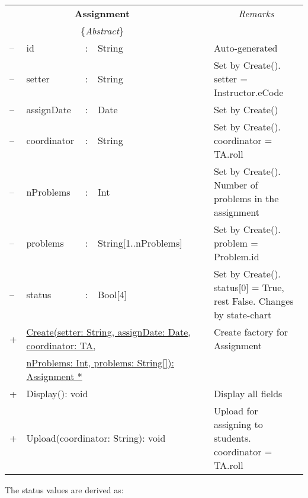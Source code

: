 \documentclass{article}
\begin{document}
\begin{enumerate}
\begin{center}
\begin{scriptsize}
\begin{tabular}{|lllll|l|p{7cm}|} \cline{1-5} \cline{7-7}
\multicolumn{5}{|c|}{\bf \textsf{Assignment}} 			& & \multicolumn{1}{|c|}{\em Remarks}\\
\multicolumn{5}{|c|}{\{{\em Abstract}\} } 	& & \multicolumn{1}{|c|}{\em }\\ \cline{1-5} \cline{7-7}
-- & \textsf{id} 			& : & String 				& & & Auto-generated\\
-- & \textsf{setter} 		& : & String 				& & & Set by Create(). \textsf{setter} = \textsf{Instructor.eCode} \\
-- & \textsf{assignDate} 	& : & Date 					& & & Set by Create() \\
-- & \textsf{coordinator}	& : & String 				& & & Set by Create(). \textsf{coordinator} = \textsf{TA.roll} \\
-- & \textsf{nProblems}		& : & Int 					& & & Set by Create(). Number of problems in the assignment \\
-- & \textsf{problems} 		& : & String[1..\textsf{nProblems}]			& & & Set by Create(). \textsf{problem} = \textsf{Problem.id} \\
-- & \textsf{status} 		& : & Bool[4] 				& & & Set by Create(). \textsf{status[0]} = True, rest False. Changes by state-chart  \\ \cline{1-5} \cline{7-7}
 + & \multicolumn{4}{l|}{\underline{Create(setter: String, assignDate: Date, coordinator: TA,}} & & Create factory for Assignment \\ 
   & \multicolumn{4}{l|}{\quad \quad \underline{nProblems: Int, problems: String[]): Assignment *}} & &  \\
 + & \multicolumn{4}{l|}{Display(): void}  & & Display all fields \\ 
 + & \multicolumn{4}{l|}{Upload(coordinator: String): void} & & Upload for assigning to students. \textsf{coordinator} = \textsf{TA.roll} \\ 
 \cline{1-5} \cline{7-7}
\end{tabular}
\end{scriptsize}
\end{center}

The \textsf{status} values are derived as:


\end{enumerate}
\end{document}
